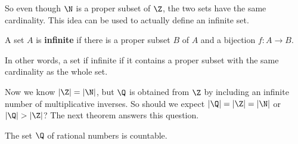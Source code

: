 So even though $\N$ is a proper subset of $\Z$, the two sets have the same cardinality. This idea can be used to actually define an infinite set.

\begin{definition} A set $A$ is \textbf{infinite} if there is a proper subset $B$ of $A$ and a bijection $f : A \to B$. 
\end{definition}

In other words, a set if infinite if it contains a proper subset with the same cardinality as the whole set. 

 \label{sec_card_set_rational}

Now we know $|\Z| = |\N|$, but $\Q$ is obtained from $\Z$ by including an infinite number of multiplicative inverses. So should we expect $|\Q| = |\Z| = |\N|$ or $|\Q| > |\Z|$? The next theorem answers this question. 

\begin{theorem} The set $\Q$ of rational numbers is countable.
\end{theorem}


